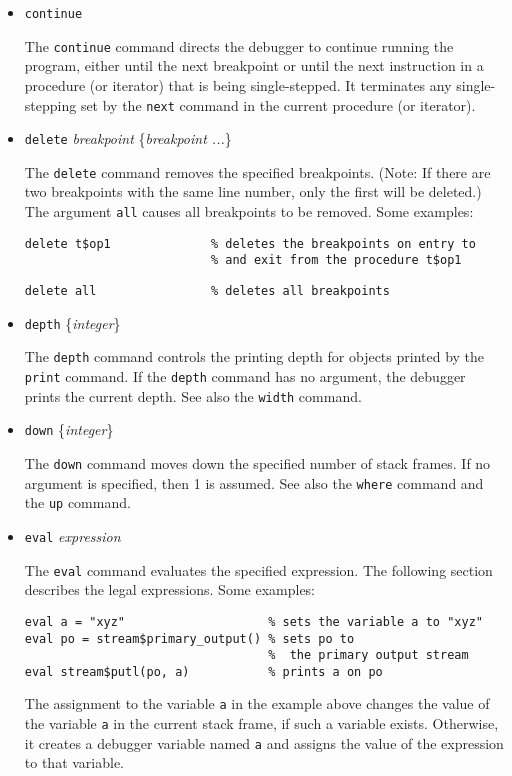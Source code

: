 \begin{itemize}
\item {\tt continue}

The {\tt continue} command directs the debugger to continue running the
program, either until the next breakpoint or until the next instruction in a
procedure (or iterator) that is being single-stepped.  It terminates any
single-stepping set by the {\tt next} command in the current procedure (or
iterator).

\item {\tt delete} {\it breakpoint} \{{\it breakpoint ...}\}

The {\tt delete} command removes the specified breakpoints.  (Note: If there
are two breakpoints with the same line number, only the first will be deleted.)
The argument {\tt all} causes all breakpoints to be removed.  Some examples:
\begin{verbatim}
delete t$op1              % deletes the breakpoints on entry to
                          % and exit from the procedure t$op1
\end{verbatim}
\begin{verbatim}
delete all                % deletes all breakpoints
\end{verbatim}

\item {\tt depth} \{{\it integer}\}

The {\tt depth} command controls the printing depth for objects printed by the
{\tt print} command.  If the {\tt depth} command has no argument, the debugger
prints the current depth.  See also the {\tt width} command.

\item {\tt down} \{{\it integer}\}

The {\tt down} command moves down the specified number of stack frames.  If no
argument is specified, then 1 is assumed.  See also the {\tt where} command and
the {\tt up} command.

\item {\tt eval} {\it expression}

The {\tt eval} command evaluates the specified expression.  The following
section describes the legal expressions.  Some examples:
\begin{verbatim}
eval a = "xyz"                    % sets the variable a to "xyz"
eval po = stream$primary_output() % sets po to
                                  %  the primary output stream
eval stream$putl(po, a)           % prints a on po
\end{verbatim}
\noindent
The assignment to the variable {\tt a} in the example above changes the value
of the variable {\tt a} in the current stack frame, if such a variable exists.
Otherwise, it creates a debugger variable named {\tt a} and assigns the value
of the expression to that variable.


\end{itemize}
